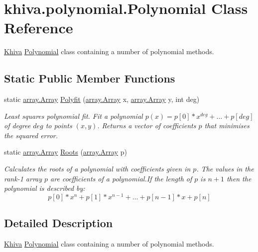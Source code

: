 \hypertarget{classkhiva_1_1polynomial_1_1_polynomial}{}\section{khiva.\+polynomial.\+Polynomial Class Reference}
\label{classkhiva_1_1polynomial_1_1_polynomial}


\mbox{\hyperlink{classkhiva_1_1_khiva}{Khiva}} \mbox{\hyperlink{classkhiva_1_1polynomial_1_1_polynomial}{Polynomial}} class containing a number of polynomial methods.  


\subsection*{Static Public Member Functions}
\begin{DoxyCompactItemize}
\item 
static \mbox{\hyperlink{classkhiva_1_1array_1_1_array}{array.\+Array}} \mbox{\hyperlink{classkhiva_1_1polynomial_1_1_polynomial_a3a0251dc90d23bebc83776785a615ad9}{Polyfit}} (\mbox{\hyperlink{classkhiva_1_1array_1_1_array}{array.\+Array}} x, \mbox{\hyperlink{classkhiva_1_1array_1_1_array}{array.\+Array}} y, int deg)
\begin{DoxyCompactList}\small\item\em Least squares polynomial fit. Fit a polynomial $p(x) = p[0] * x^{deg} + ... + p[deg]$ of degree $deg$ to points $(x, y)$. Returns a vector of coefficients $p$ that minimises the squared error. \end{DoxyCompactList}\item 
static \mbox{\hyperlink{classkhiva_1_1array_1_1_array}{array.\+Array}} \mbox{\hyperlink{classkhiva_1_1polynomial_1_1_polynomial_a557baa3b31ba666176f9ed67b6a06abb}{Roots}} (\mbox{\hyperlink{classkhiva_1_1array_1_1_array}{array.\+Array}} p)
\begin{DoxyCompactList}\small\item\em Calculates the roots of a polynomial with coefficients given in $p$. The values in the rank-\/1 array $p$ are coefficients of a polynomial.\+If the length of $p$ is $n+1$ then the polynomial is described by\+: \[ p[0] * x ^ n + p[1] * x ^{n-1} + ... + p[n - 1] * x + p[n] \] \end{DoxyCompactList}\end{DoxyCompactItemize}


\subsection{Detailed Description}
\mbox{\hyperlink{classkhiva_1_1_khiva}{Khiva}} \mbox{\hyperlink{classkhiva_1_1polynomial_1_1_polynomial}{Polynomial}} class containing a number of polynomial methods. 



